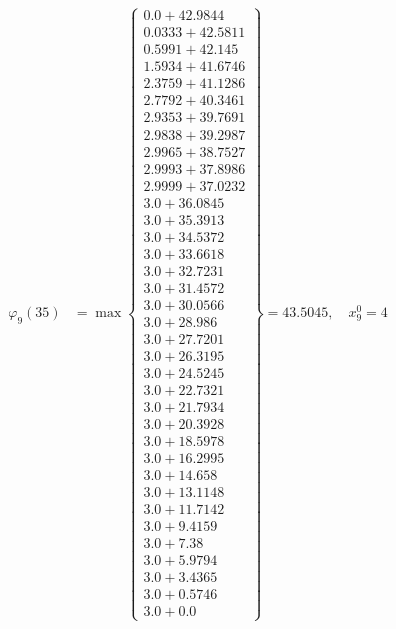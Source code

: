 \documentclass{article}
\begin{document}
\begin{align*}
  
\varphi_{9}(35) &= \max \left\{ \begin{array}{c}
0.0 + 42.9844 \\
 0.0333 + 42.5811 \\
 0.5991 + 42.145 \\
 1.5934 + 41.6746 \\
 2.3759 + 41.1286 \\
 2.7792 + 40.3461 \\
 2.9353 + 39.7691 \\
 2.9838 + 39.2987 \\
 2.9965 + 38.7527 \\
 2.9993 + 37.8986 \\
 2.9999 + 37.0232 \\
 3.0 + 36.0845 \\
 3.0 + 35.3913 \\
 3.0 + 34.5372 \\
 3.0 + 33.6618 \\
 3.0 + 32.7231 \\
 3.0 + 31.4572 \\
 3.0 + 30.0566 \\
 3.0 + 28.986 \\
 3.0 + 27.7201 \\
 3.0 + 26.3195 \\
 3.0 + 24.5245 \\
 3.0 + 22.7321 \\
 3.0 + 21.7934 \\
 3.0 + 20.3928 \\
 3.0 + 18.5978 \\
 3.0 + 16.2995 \\
 3.0 + 14.658 \\
 3.0 + 13.1148 \\
 3.0 + 11.7142 \\
 3.0 + 9.4159 \\
 3.0 + 7.38 \\
 3.0 + 5.9794 \\
 3.0 + 3.4365 \\
 3.0 + 0.5746 \\
 3.0 + 0.0
\end{array} \right\}=43.5045,\quad x_{9}^0=4\\
  
  
  

\end{align*}
\end{document}
